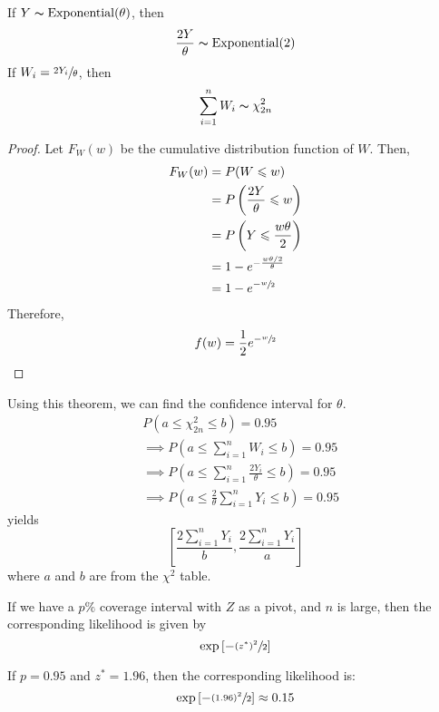 \begin{thmbox}
    \begin{theorem}
        If $ Y \thicksim \operatorname{Exponential}(\theta) $, then
        \[ \frac{2Y}{\theta} \thicksim \operatorname{Exponential}(2) \]
        If $ W_i=\sfrac{2Y_i}{\theta} $, then
        \[ \sum\limits_{i=1}^{n} W_i \thicksim \chi^2_{2n} \]
    \end{theorem}
\end{thmbox}
\begin{proof}
    Let $ F_W(w) $ be the cumulative distribution function of $ W $. Then,
    \begin{align*}
        F_W(w)
         & =P(W\leqslant w)                               \\
         & =P\left( \frac{2Y}{\theta} \leqslant w \right) \\
         & =P\left( Y\leqslant \frac{w\theta}{2} \right)  \\
         & =1-e^{-\frac{w\theta/2}{\theta}}               \\
         & =1-e^{-\sfrac{w}{2}}
    \end{align*}
    Therefore,
    \[ f(w)=\frac{1}{2} e^{-\sfrac{w}{2}} \]
\end{proof}
Using this theorem, we can find the confidence interval for $ \theta $.
\begin{align*}
     & P\left(a\leqslant \chi^2_{2n}\leqslant b\right)=0.95                                         \\
     & \implies P\left(a \leqslant \sum\limits_{i=1}^{n} W_i \leqslant b\right)=0.95                \\
     & \implies P\left(a\leqslant \sum\limits_{i=1}^{n} \frac{2Y_i}{\theta} \leqslant b\right)=0.95 \\
     & \implies P\left(a\leqslant \frac{2}{\theta} \sum\limits_{i=1}^{n} Y_i\leqslant b\right)=0.95
\end{align*}
yields
\[ \left[ \frac{2 \sum\limits_{i=1}^{n} Y_i}{b} , \frac{2 \sum\limits_{i=1}^{n} Y_i}{a} \right] \]
where $ a $ and $ b $ are from the $ \chi^2 $ table.

\begin{thmbox}
    \begin{theorem}
        If we have a $ p\% $ coverage interval with $ Z $ as a pivot, and $ n $ is large, then
        the corresponding likelihood is given by
        \[ \exp\left[-\sfrac{(z^*)^2}{2}\right] \]
    \end{theorem}
\end{thmbox}

\begin{exbox}
    \begin{example}
        If $ p=0.95 $ and $ z^*=1.96 $, then the corresponding likelihood is:
        \[ \exp\left[-\sfrac{(1.96)^2}{2}\right] \approx 0.15 \]
    \end{example}
\end{exbox}
